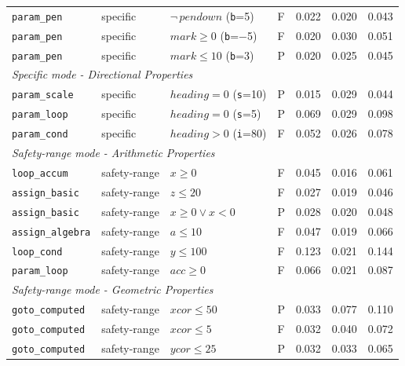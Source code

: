 \begin{longtable}{p{} p{} p{} c r r r}
\texttt{param\_pen}      & specific & $\neg\,\mathit{pendown}$ (\texttt{b}=5) & F & 0.022 & 0.020 & 0.043 \\
\texttt{param\_pen}      & specific & $\mathit{mark}\geq 0$ (\texttt{b}=$-$5) & F & 0.020 & 0.030 & 0.051 \\
\texttt{param\_pen}      & specific & $\mathit{mark}\leq 10$ (\texttt{b}=3)  & P & 0.020 & 0.025 & 0.045 \\
\midrule
\multicolumn{7}{l}{\textit{Specific mode - Directional Properties}} \\
\midrule
\texttt{param\_scale}    & specific & $\mathit{heading}=0$ (\texttt{s}=10) & P & 0.015 & 0.029 & 0.044 \\
\texttt{param\_loop}     & specific & $\mathit{heading}=0$ (\texttt{s}=5)  & P & 0.069 & 0.029 & 0.098 \\
\texttt{param\_cond}     & specific & $\mathit{heading}>0$ (\texttt{i}=80) & F & 0.052 & 0.026 & 0.078 \\
\midrule
\multicolumn{7}{l}{\textit{Safety-range mode - Arithmetic Properties}} \\
\midrule
\texttt{loop\_accum}     & safety-range & $x \geq 0$                    & F & 0.045 & 0.016 & 0.061 \\
\texttt{assign\_basic}   & safety-range & $z \leq 20$                   & F & 0.027 & 0.019 & 0.046 \\
\texttt{assign\_basic}   & safety-range & $x{\geq}0\vee x{<}0$         & P & 0.028 & 0.020 & 0.048 \\
\texttt{assign\_algebra} & safety-range & $a \leq 10$                   & F & 0.047 & 0.019 & 0.066 \\
\texttt{loop\_cond}      & safety-range & $y \leq 100$                  & F & 0.123 & 0.021 & 0.144 \\
\texttt{param\_loop}     & safety-range & $\mathit{acc}\geq 0$          & F & 0.066 & 0.021 & 0.087 \\
\midrule
\multicolumn{7}{l}{\textit{Safety-range mode - Geometric Properties}} \\
\midrule
\texttt{goto\_computed}  & safety-range & $\mathit{xcor}\leq 50$       & P & 0.033 & 0.077 & 0.110 \\
\texttt{goto\_computed}  & safety-range & $\mathit{xcor}\leq 5$        & F & 0.032 & 0.040 & 0.072 \\
\texttt{goto\_computed}  & safety-range & $\mathit{ycor}\leq 25$       & P & 0.032 & 0.033 & 0.065 \\

\end{longtable}
